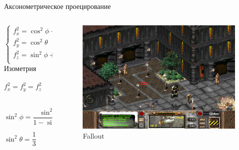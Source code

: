 \documentclass{beamer}
\begin{document}
	\begin{frame}{Аксонометрическое проецирование}

		\begin{columns}
			\begin{column}{0.45\textwidth}
		\[
			\begin{cases}
				f_x^2 = \cos^2 \phi + \sin^2 \phi \sin^2 \theta \\
				f_y^2 = \cos^2 \theta \\
				f_z^2 = \sin^2 \phi + \cos^2 \phi \sin^2 \theta \\
			\end{cases}	
		\]
		Изометрия
		\[
			f_x^2 = f_y^2 = f_z^2
			\qquad
			\begin{cases}
				f_x^2 = f_y^2  \\
				f_y^2 = f_z^2 \\
			\end{cases}	
		\]

		\[
			\sin^2 \phi  = \frac{\sin^2 \theta}{1 - \sin^2 \theta}
		\]


		\[
			\sin^2 \theta  = \frac{1}{3}
			\qquad
			\sin^2 \phi  = \frac{1}{2}
		\]

	\end{column}
	\begin{column}{0.55\textwidth}
		\begin{figure} 
				\includegraphics[width=\textwidth]{images/fallout_2.jpg}
			\caption{Fallout}
		\end{figure}
	\end{column}
\end{columns}

		\note{
			{ \tiny
			\[
				\cos^2 \phi + \sin^2 \phi \sin^2 \theta = cos^2 \theta
			\]
			\[
				(1 - \sin^2 \phi) + \sin^2 \phi \sin^2 \theta = (1 - \sin^2 \theta)
			\]

}}
\end{frame}
\end{document}
